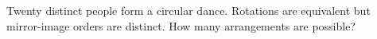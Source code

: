 Twenty distinct people form a circular dance. Rotations are equivalent but mirror-image orders are distinct. How many arrangements are possible?
